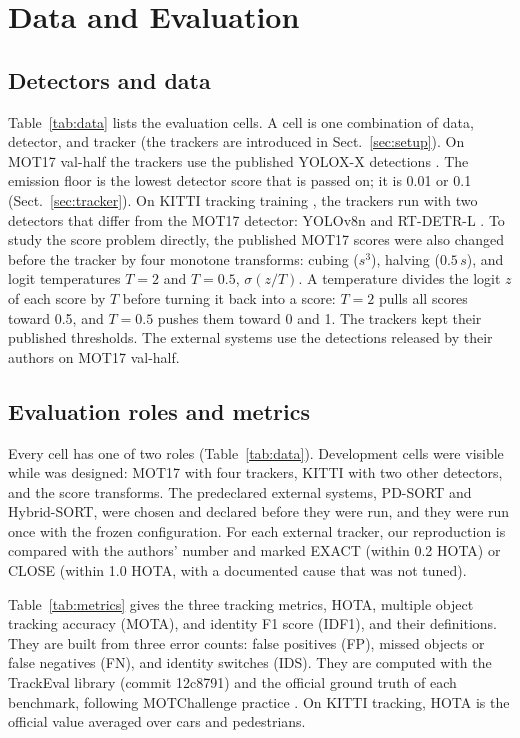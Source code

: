 \section{Data and Evaluation}\label{sec:data-eval}

\subsection{Detectors and data}\label{sec:data}
Table~\ref{tab:data} lists the evaluation cells. A cell is one combination of
data, detector, and tracker (the trackers are introduced in
Sect.~\ref{sec:setup}). On MOT17 val-half \cite{milan2016mot16} the trackers
use the published YOLOX-X detections \cite{ge2021yolox}. The emission floor is
the lowest detector score that is passed on; it is 0.01 or 0.1
(Sect.~\ref{sec:tracker}). On KITTI tracking training \cite{geiger2012kitti},
the trackers run with two detectors that differ from the MOT17 detector:
YOLOv8n \cite{jocher2023yolov8} and RT-DETR-L \cite{zhao2024rtdetr}. To study
the score problem directly, the published MOT17 scores were also changed
before the tracker by four monotone transforms: cubing ($s^3$), halving ($0.5\,s$),
and logit temperatures $T=2$ and $T=0.5$, $\sigma(z/T)$. A temperature
divides the logit $z$ of each score by $T$ before turning it back into a
score: $T=2$ pulls all scores toward 0.5, and $T=0.5$ pushes them toward 0
and 1. The trackers kept their published thresholds. The external systems use the detections released
by their authors on MOT17 val-half.



\subsection{Evaluation roles and metrics}\label{sec:roles}
Every cell has one of two roles (Table~\ref{tab:data}). Development cells
were visible while \scl{} was designed: MOT17 with four trackers, KITTI with
two other detectors, and the score transforms. The predeclared external systems,
PD-SORT and Hybrid-SORT, were chosen and declared before they were run, and
they were run once with the frozen configuration. For each external tracker,
our reproduction is compared with the authors' number and marked EXACT
(within 0.2 HOTA) or CLOSE (within 1.0 HOTA, with a documented cause that was
not tuned).

\label{sec:metrics}Table~\ref{tab:metrics} gives the three tracking metrics,
HOTA, multiple object tracking accuracy (MOTA), and identity F1 score (IDF1),
and their definitions. They are built from three error counts: false
positives (FP), missed objects or false negatives (FN), and identity switches
(IDS). They are computed with the TrackEval library (commit
12c8791) and the official ground truth of each benchmark, following
MOTChallenge practice \cite{dendorfer2021motchallenge}. On KITTI tracking,
HOTA is the official value averaged over cars and pedestrians.

